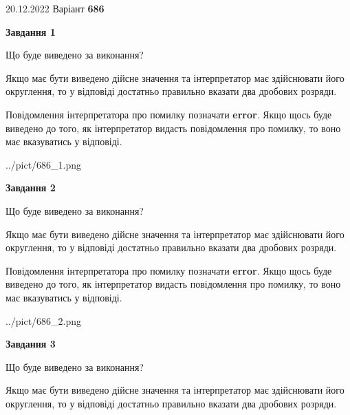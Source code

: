 \documentclass[12pt, ukrainian]{article}
\begin{document}
{20.12.2022 Варіант \No \textbf { 686 }\par}
{
\begin {Large}

{\begin {center}\textbf{Завдання 1}\end {center}}\par
Що буде виведено за виконання? \par

Якщо має бути виведено дійсне значення та інтерпретатор має здійснювати його округлення, 
то у відповіді достатньо правильно вказати два дробових розряди.

Повідомлення інтерпретатора про помилку позначати \textbf{error}.
Якщо щось буде виведено до того, як інтерпретатор видасть повідомлення про помилку, 
то воно має вказуватись у відповіді. \par

\begin{center}
	{../pict/686_1.png}
\end{center}
\newpage

{\begin {center}\textbf{Завдання 2}\end {center}}\par
Що буде виведено за виконання? \par

Якщо має бути виведено дійсне значення та інтерпретатор має здійснювати його округлення, 
то у відповіді достатньо правильно вказати два дробових розряди.

Повідомлення інтерпретатора про помилку позначати \textbf{error}.
Якщо щось буде виведено до того, як інтерпретатор видасть повідомлення про помилку, 
то воно має вказуватись у відповіді. \par

\begin{center}
	{../pict/686_2.png}
\end{center}
\newpage

{\begin {center}\textbf{Завдання 3}\end {center}}\par
Що буде виведено за виконання? \par

Якщо має бути виведено дійсне значення та інтерпретатор має здійснювати його округлення, 
то у відповіді достатньо правильно вказати два дробових розряди.


\end{Large}}
\end{document}
